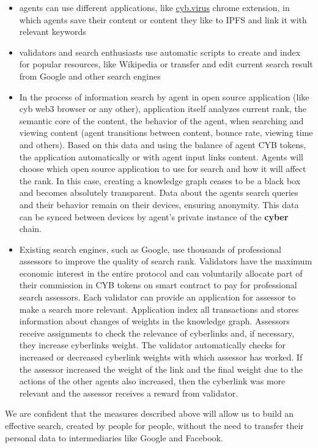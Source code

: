\documentclass[10pt,oneside]{amsart}
\newcommand{\code}[1]{\textbf{#1}}
\begin{document}
\begin{itemize}
\item agents can use different applications, like \href{https://github.com/cybercongress/cyb-virus}{cyb.virus} chrome extension, in which agents save their content or content they like to IPFS and link it with relevant keywords
\item validators and search enthusiasts use automatic scripts to create and index for popular resources, like Wikipedia or transfer and edit current search result from Google and other search engines
\item In the process of information search by agent in open source application (like cyb web3 browser or any other), application itself analyzes current rank, the semantic core of the content, the behavior of the agent, when searching and viewing content  (agent transitions between content, bounce rate, viewing time and others). Based on this data and using the balance of agent CYB tokens, the application automatically or with agent input links content. Agents will choose which open source application to use for search and how it will affect the rank. In this case, creating a knowledge graph ceases to be a black box and becomes absolutely transparent. Data about the agents search queries and their behavior remain on their devices, ensuring anonymity. This data can be synced between devices by agent's private instance of the \code{cyber} chain.
\item Existing search engines, such as Google, use thousands of professional assessors to improve the quality of search rank. Validators have the maximum economic interest in the entire protocol and can voluntarily allocate part of their commission in CYB tokens on smart contract to pay for professional search assessors. Each validator can provide an application for assessor to make a search more relevant. Application index all transactions and stores information about changes of weights in the knowledge graph. Assessors receive assignments to check the relevance of cyberlinks and, if necessary, they increase cyberlinks weight. The validator automatically checks for increased or decreased cyberlink weights with which assessor has worked. If the assessor increased the weight of the link and the final weight due to the actions of the other agents also increased, then the cyberlink was more relevant and the assessor receives a reward from validator.
\end{itemize}

We are confident that the measures described above will allow us to build an effective search, created by people for people, without the need to transfer their personal data to intermediaries like Google and Facebook.
\end{document}

